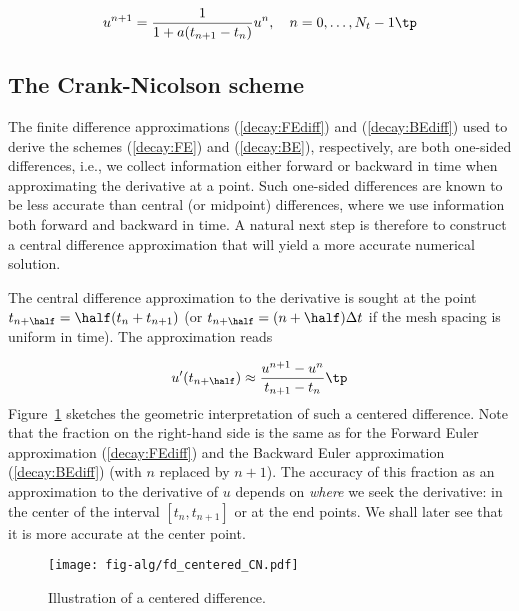 \documentclass[graybox,sectrefs,envcountresetchap,open=right,final]{svmonodo}
\begin{document}
\begin{equation}
u^{n+1} = \frac{1}{1+ a(t_{n+1}-t_n)} u^n,\quad n=0,\ldots,N_t-1\tp
\label{decay:BE}
\end{equation}

\subsection{The Crank-Nicolson scheme}
\label{decay:schemes:CN}

 

The finite difference approximations
(\ref{decay:FEdiff}) and (\ref{decay:BEdiff}) used to derive the schemes
(\ref{decay:FE}) and (\ref{decay:BE}), respectively,
are both one-sided differences, i.e.,
we collect information either forward or backward in time when approximating
the derivative at a point. Such one-sided differences are
known to be less accurate than central (or midpoint)
differences, where we use information both forward and backward in
time. A natural next step is therefore to construct
a central difference approximation that will yield a more accurate
numerical solution.

The central difference approximation to the derivative is sought at the
point $t_{n+\half}=\half (t_n + t_{n+1})$ (or
$t_{n+\half}=(n+\half)\Delta t$ if the mesh spacing is uniform in time).
The approximation reads

\begin{equation}
u^{\prime}(t_{n+\half}) \approx \frac{u^{n+1}-u^n}{t_{n+1}-t_n}\tp
\label{decay:CNdiff}
\end{equation}
Figure~\ref{decay:sketch:CN} sketches the geometric interpretation of
such a centered difference.
Note that the fraction on the right-hand side is the same as for the
Forward Euler approximation (\ref{decay:FEdiff}) and
the Backward Euler approximation (\ref{decay:BEdiff}) (with
$n$ replaced by $n+1$). The accuracy of this fraction as an approximation
to the derivative of $u$ depends on \emph{where} we seek the derivative:
in the center of the interval $[t_{n},t_{n+1}]$ or at the end points.
We shall later see that it is more accurate at the center point.

\begin{figure}[!ht]  %
  \centerline{\texttt{[image: fig-alg/fd\_centered\_CN.pdf]}}
  \caption{
  Illustration of a centered difference. \label{decay:sketch:CN}
  }
\end{figure}
\end{document}
